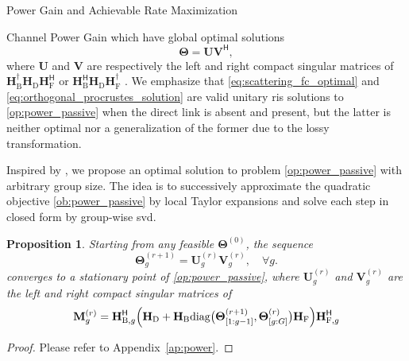 \documentclass[journal]{IEEEtran}
\newtheorem{proposition}{Proposition}
\begin{document}
\begin{section}{Power Gain and Achievable Rate Maximization}
\begin{subsection}{Channel Power Gain}
		which have global optimal solutions
		\begin{equation}
			\mathbf{\Theta} = \mathbf{U} \mathbf{V}^\mathsf{H},
			\label{eq:orthogonal_procrustes_solution}
		\end{equation}
		where $\mathbf{U}$ and $\mathbf{V}$ are respectively the left and right compact singular matrices of $\mathbf{H}_\mathrm{B}^\dagger \mathbf{H}_\mathrm{D} \mathbf{H}_\mathrm{F}^\mathsf{H}$ or $\mathbf{H}_\mathrm{B}^\mathsf{H} \mathbf{H}_\mathrm{D} \mathbf{H}_\mathrm{F}^\dagger$ \cite{Golub2013}.
		We emphasize that \eqref{eq:scattering_fc_optimal} and \eqref{eq:orthogonal_procrustes_solution} are valid unitary \gls{ris} solutions to \eqref{op:power_passive} when the direct link is absent and present, but the latter is neither optimal nor a generalization of the former due to the lossy transformation.

		Inspired by \cite{Nie2017}, we propose an optimal solution to problem \eqref{op:power_passive} with arbitrary group size.
		The idea is to successively approximate the quadratic objective \eqref{ob:power_passive} by local Taylor expansions and solve each step in closed form by group-wise \gls{svd}.

		\begin{proposition}\label{pp:power}
			Starting from any feasible $\mathbf{\Theta}^{(0)}$, the sequence
			\begin{equation}
				\mathbf{\Theta}_g^{(r+1)} = \mathbf{U}_g^{(r)} \mathbf{V}_g^{(r)}, \quad \forall g.
				\label{eq:scattering_power}
			\end{equation}
			converges to a stationary point of \eqref{op:power_passive}, where $\mathbf{U}_g^{(r)}$ and $\mathbf{V}_g^{(r)}$ are the left and right compact singular matrices of
			\begin{equation}
				\mathbf{M}_g^{(r)} = \mathbf{H}_{\mathrm{B},g}^\mathsf{H} \Bigl(\mathbf{H}_\mathrm{D} + \mathbf{H}_\mathrm{B} \mathrm{diag}\bigl(\mathbf{\Theta}_{[1:g-1]}^{(r+1)},\mathbf{\Theta}_{[g:G]}^{(r)}\bigr) \mathbf{H}_\mathrm{F}\Bigr) \mathbf{H}_{\mathrm{F},g}^\mathsf{H}
				\label{eq:auxiliary_matrix_power}
			\end{equation}
		\end{proposition}

		\begin{proof}
			Please refer to Appendix~\ref{ap:power}.
		\end{proof}


\end{subsection}
\end{section}
\end{document}

